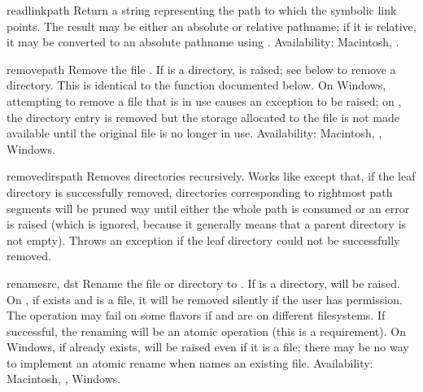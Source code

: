 \begin{funcdesc}{readlink}{path}
Return a string representing the path to which the symbolic link
points.  The result may be either an absolute or relative pathname; if
it is relative, it may be converted to an absolute pathname using
.
Availability: Macintosh, \UNIX.
\end{funcdesc}

\begin{funcdesc}{remove}{path}
Remove the file .  If  is a directory,
 is raised; see  below to remove
a directory.  This is identical to the  function
documented below.  On Windows, attempting to remove a file that is in
use causes an exception to be raised; on \UNIX, the directory entry is
removed but the storage allocated to the file is not made available
until the original file is no longer in use.
Availability: Macintosh, \UNIX, Windows.
\end{funcdesc}

\begin{funcdesc}{removedirs}{path}
Removes directories recursively.  Works like
 except that, if the leaf directory is
successfully removed, directories corresponding to rightmost path
segments will be pruned way until either the whole path is consumed or
an error is raised (which is ignored, because it generally means that
a parent directory is not empty).  Throws an 
exception if the leaf directory could not be successfully removed.
\end{funcdesc}

\begin{funcdesc}{rename}{src, dst}
Rename the file or directory  to .  If  is
a directory,  will be raised.  On \UNIX, if
 exists and is a file, it will be removed silently if the
user has permission.  The operation may fail on some \UNIX{} flavors
if  and  are on different filesystems.  If
successful, the renaming will be an atomic operation (this is a
\POSIX{} requirement).  On Windows, if  already exists,
 will be raised even if it is a file; there may be
no way to implement an atomic rename when  names an existing
file.
Availability: Macintosh, \UNIX, Windows.
\end{funcdesc}

